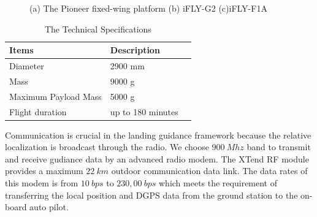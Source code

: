 \begin{figure}[!tb]
	\centering
	
	\caption{(a) The Pioneer fixed-wing platform (b) iFLY-G2 (c)iFLY-F1A   }
\end{figure}



\begin{table}
	\caption{The Technical Specifications}
	\label{tab:platform_specifications}
	\begin{center}
		\renewcommand{\arraystretch}{1.1}
		\begin{tabular}{lll}
			\hline
			\textbf {Items}  & \textbf{Description} \\
			\hline
			Diameter & 2900 mm \\
			Mass & 9000 g \\
			Maximum Payload Mass & 5000 g \\
			Flight duration & up to 180 minutes \\									
			\hline
		\end{tabular}
	\end{center}
\end{table}

Communication is crucial in the landing guidance framework because the relative localization is broadcast through the radio. We choose $900\ Mhz$ band to transmit and receive gudiance data by an advanced radio modem. The XTend RF module provides a maximum $22\ km$ outdoor communication data link. The data rates of this modem is from $10\ bps$ to $230,00\ bps$ which meets the requirement of transferring the local position and DGPS data from the ground station to the on-board auto pilot. 
 
